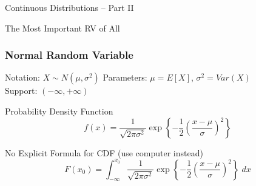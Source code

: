 \documentclass[handout]{beamer}
\date{Lecture \# 12}
\begin{document}
 


\begin{frame}[plain]
	\titlepage 
	

\end{frame} 


\begin{frame}
\begin{center}
\Huge Continuous Distributions -- Part II
\end{center}
\end{frame}


\begin{frame}
\Huge \begin{center}
The Most Important RV of All
\end{center}

\end{frame}
\begin{frame}
\frametitle{Normal Random Variable}
\begin{block}{Notation: $X \sim N(\mu, \sigma^2)$}
Parameters: $\mu = E[X]$, $\sigma^2 = Var(X)$\\ Support:  $(-\infty, +\infty)$
\end{block}


\begin{block}{Probability Density Function}
	$$ f(x) = \frac{1}{\sqrt{2\pi \sigma^2}} \exp \left\{ - \frac{1}{2} \left(\frac{x - \mu}{\sigma} \right)^2 \right\}$$
\end{block}


\begin{block}{No Explicit Formula for CDF (use computer instead)}
	$$F(x_0) = \int_{-\infty}^{x_0}  \frac{1}{\sqrt{2\pi \sigma^2}} \exp \left\{ - \frac{1}{2} \left(\frac{x - \mu}{\sigma} \right)^2 \right\} \; dx$$
\end{block}
\end{frame}

\end{document}
